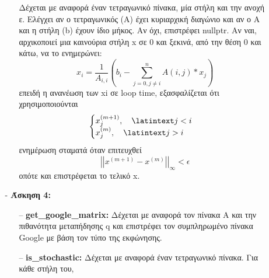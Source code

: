 \documentclass{article}
\newcommand{\lt}{\latintext}
\newcommand{\gt}{\greektext}
\begin{document}
\begin{itemize}
\begin{itemize}
\begin{itemize}
                            \gt Δέχεται με αναφορά έναν τετραγωνικό πίνακα, μία στήλη
                            \gt και την ανοχή ε.
                            \gt Ελέγχει αν ο τετραγωνικός (Α) έχει κυριαρχική διαγώνιο και αν
                            \gt ο Α και η στήλη (\lt b) \gt έχουν ίδιο μήκος. Αν όχι, επιστρέφει
                            \lt nullptr.
                            \gt Αν ναι, αρχικοποιεί μια καινούρια στήλη \lt x \gt σε 0 και
                            \gt ξεκινά, από την θέση 0 και κάτω, να το ενημερώνει:
                            \begin{equation*}
                                x_{i} = \frac{1}{A_{i,i}}(b_{i} - \sum_{j=0,j \neq i}^{n}A(i,j)*x_{j})
                            \end{equation*}
                            \gt επειδή η ανανέωση των \lt xi  σε
                            \lt loop time, \gt εξασφαλίζεται ότι χρησιμοποιούνται
                            \begin{equation*}
                                \begin{cases}
                                    x_{j}^{(m+1)}, \quad \lt j<i\\
                                    x_{j}^{(m)}, \quad \lt j>i
                                \end{cases}
                            \end{equation*}
                             ενημέρωση σταματά όταν επιτευχθεί
                            \begin{equation*}
                                \left|\left| x^{(m+1)} - x^{(m)} \right|\right|_{\infty} < \epsilon
                            \end{equation*}
                            \gt οπότε και επιστρέφεται το τελικό \lt x.
                            \end{itemize}
                \item [-] \textbf{\gt Άσκηση 4:}
                \begin{itemize}
                    \item [--] \textbf{\lt get\_google\_matrix:}
                            \gt Δέχεται με αναφορά τον πίνακα Α και την πιθανότητα μεταπήδησης \lt q
                            \gt και επιστρέφει τον συμπληρωμένο πίνακα \lt Google \gt με βάση τον
                            \gt τύπο της εκφώνησης.
                    \item [--] \textbf{\lt is\_stochastic:}
                            \gt Δέχεται με αναφορά έναν τετραγωνικό πίνακα. Για κάθε στήλη του,

\end{itemize}
\end{itemize}
\end{itemize}
\end{document}
